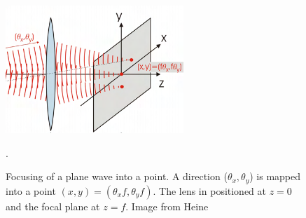 \begin{figure}
    \centering
    \includegraphics[width=0.6\textwidth]{chapters/chapter_2/figures/fourier.png}
    \caption{Focusing of a plane wave into a point. A direction ($\theta_x, \theta_y$) is mapped into a point $(x,y) = (\theta_x f, \theta_y f)$. The lens in positioned at $z=0$ and the focal plane at $z=f$. Image from Heine \cite{saleh1991}}.
    \label{fig:fourier}
\end{figure}

